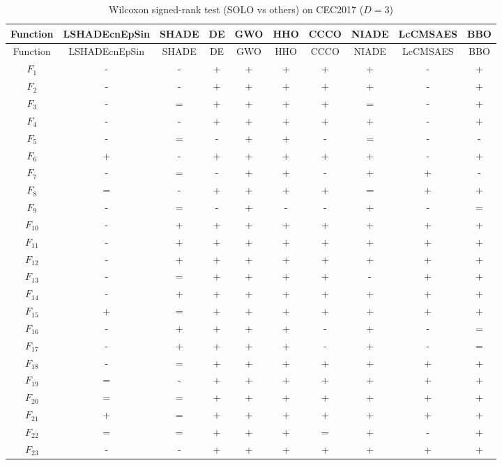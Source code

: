 \begin{center}
\small
\renewcommand{\arraystretch}{1.25}
\begin{longtable}{cccccccccc}
\caption{Wilcoxon signed-rank test (SOLO vs others) on CEC2017 ($D=3$) }
\label{tab:wilcoxon_CEC2017_3} \\
\toprule
Function & LSHADEcnEpSin & SHADE & DE & GWO & HHO & CCCO & NIADE & LcCMSAES & BBO \\
\midrule
\endfirsthead
\toprule
Function & LSHADEcnEpSin & SHADE & DE & GWO & HHO & CCCO & NIADE & LcCMSAES & BBO \\
\midrule
\endhead
$F_{1}$ & - & - & + & + & + & + & + & - & + \\
$F_{2}$ & - & - & + & + & + & + & + & - & + \\
$F_{3}$ & - & = & + & + & + & + & = & - & + \\
$F_{4}$ & - & - & + & + & + & + & + & - & + \\
$F_{5}$ & - & = & - & + & + & - & = & - & - \\
$F_{6}$ & + & - & + & + & + & + & + & - & + \\
$F_{7}$ & - & = & - & + & + & - & + & + & - \\
$F_{8}$ & = & - & + & + & + & + & = & + & + \\
$F_{9}$ & - & = & - & + & - & - & + & - & = \\
$F_{10}$ & - & + & + & + & + & + & + & + & + \\
$F_{11}$ & - & + & + & + & + & + & + & + & + \\
$F_{12}$ & - & + & + & + & + & + & + & + & + \\
$F_{13}$ & - & = & + & + & + & + & - & + & + \\
$F_{14}$ & - & + & + & + & + & + & + & + & + \\
$F_{15}$ & + & = & + & + & + & + & + & + & + \\
$F_{16}$ & - & + & + & + & + & - & + & - & = \\
$F_{17}$ & - & + & + & + & + & - & + & - & = \\
$F_{18}$ & - & = & + & + & + & + & + & + & + \\
$F_{19}$ & = & - & + & + & + & + & + & + & + \\
$F_{20}$ & = & = & + & + & + & + & + & + & + \\
$F_{21}$ & + & = & + & + & + & + & + & + & + \\
$F_{22}$ & = & = & + & + & + & = & + & - & + \\
$F_{23}$ & - & - & + & + & + & + & + & + & + \\

\end{longtable}
\end{center}
